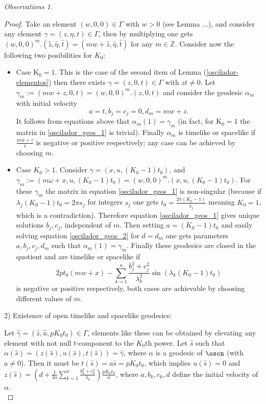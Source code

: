 \documentclass[11pt]{amsart}
\theoremstyle{plain}
\theoremstyle{definition}
\theoremstyle{remark}
\newtheorem{obs}[thm]{Observations}
\begin{document}
\begin{obs}
\begin{proof}
Take an element $(w,0,0) \in \Gamma$ with $w>0$ (see Lemma ...), and consider any element $\gamma=(z, \eta, t) \in \Gamma$, then by multiplying one gets  $(w,0,0)^m.(\hat{z}, \hat{\eta}, \hat{t})=(m w+\hat{z}, \hat{\eta}, \hat{t})$ for any $m \in \mathbb{Z}$. Consider now the following two posibilities for $K_0$:

\begin{itemize}
    \item Case $\mathrm{K_0} = 1$. This is the case of the second item of Lemma (\ref{oscilador-elementos}) then there exists $\gamma = (z,0,t) \in \Gamma$ with $z t \neq 0$. Let $\gamma_m := (m w+z, 0, t)=(w,0,0)^m.(z,0,t)$ and consider the geodesic $\alpha_m$ with initial velocity $$a=t, b_j=c_j=0, d_m = m w + z.$$  It follows from equations above that $\alpha_m(1)=\gamma_m$ (in fact, for $\mathrm{K_0}=1$ the matrix in \eqref{oscilador_geos_1} is trivial). Finally $\alpha_m$ is timelike or spacelike if $\frac{mw+z}{t}$ is negative or positive respectively; any case can be achieved by choosing $m$. 

    \item Case $K_0>1$. Consider $\gamma=(x,u,(K_0-1)t_0)$, and $\gamma_m := {(m \omega + x, u, (K_0-1) t_0)} = (w,0,0)^m.(x,u,(K_0-1) t_0)$. For these $\gamma_m$ the matrix in equation \eqref{oscilador_geos_1} is non-singular (because if $\lambda_j (K_0-1) t_0 = 2 \pi s_j$ for integers $s_j$ one gets $t_0 = \frac{2 \pi (K_0-1)}{\lambda_j}$ meaning $K_0=1$, which is a contradiction). Therefore equation \eqref{oscilador_geos_1} gives unique solutions $b_j,c_j$, independent of $m$. Then setting $a=(K_0-1) t_0$ and easily solving equation \eqref{oscilador_geos_2} for $d=d_m$ one gets parameters $a,b_j,c_j,d_m$ such that $\alpha_m(1) = \gamma_m$.     
    Finally these geodesics are closed in the quotient and are timelike or spacelike if $$ 2 p t_0 (mw+x) - \sum_{k=1}^{n} \frac{b_j^2 + c_j^2}{\lambda_k^2}\sin(\lambda_k (K_0-1) t_0) $$ is negative or positive respectively, both cases are achievable by choosing different values of $m$. \\
    
\end{itemize}

2) Existence of open timelike and spacelike geodesics:

Let $\hat{\gamma}=(\hat{z},\hat{u}, p K_0 t_0) \in \Gamma$, elements like these can be obtained by elevating any element with not null $t$-component to the $K_0$th power. Let $\hat{s}$ such that $\alpha(\hat{s})=(z(\hat{s}),u(\hat{s}),t(\hat{s})) = \hat{\gamma}$, where $\alpha$ is a geodesic of $\oscn$ (with $a \neq 0$). Then it must be $t(\hat{s}) = a \hat{s} = p K_0 t_0$, which implies $u(\hat{s})=0$ and $z(\hat{s}) = (d + \frac{1}{2 a} \sum^n_{k=1} \frac{b_k^2+ c_k^2}{\lambda_k}) \frac{p K_0 t_0}{a}$, where $a, b_k, c_k, d$ define the initial velocity of $\alpha$. \\
    

\end{proof}
\end{obs}
\end{document}
